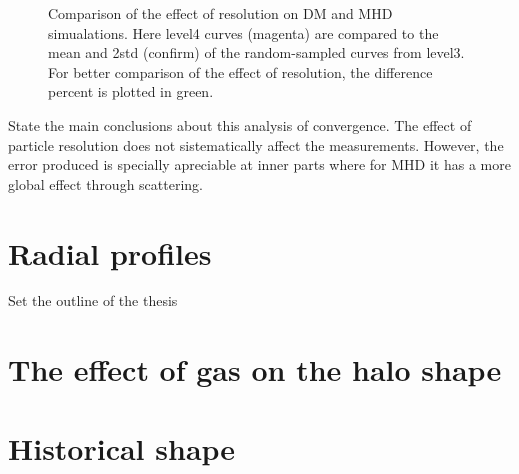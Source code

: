 \begin{figure}[!ht]
  \centering
  \hfill
  \caption{Comparison of the effect of resolution on DM and MHD simualations. Here level4 curves (magenta) are compared to the mean and 2std (confirm) of the random-sampled curves from level3. For better comparison of the effect of resolution, the difference percent is plotted in green.  }
\end{figure}



State the main conclusions about this analysis of convergence. The effect of particle resolution does not sistematically affect the measurements. However, the error produced is specially apreciable at inner parts where for MHD it has a more global effect through scattering.\\

\section{Radial profiles}

Set the outline of the thesis



\section{The effect of gas on the halo shape}




\section{Historical shape}


 